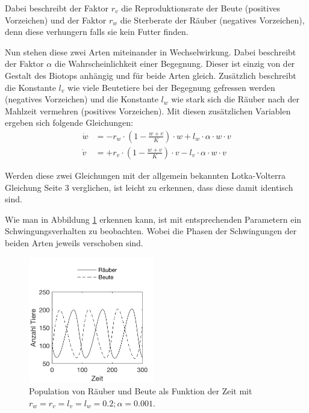 \documentclass[a4paper,twoside]{article}
\begin{document}
	Dabei beschreibt der Faktor \(r_v\) die Reproduktionsrate der Beute (positives Vorzeichen) und der Faktor \(r_w\) die Sterberate der Räuber (negatives Vorzeichen), denn diese verhungern falls sie kein Futter finden.

	Nun stehen diese zwei Arten miteinander in Wechselwirkung. Dabei beschreibt der Faktor \(\alpha\) die Wahrscheinlichkeit einer Begegnung. Dieser ist einzig von der Gestalt des Biotops anhängig und für beide Arten gleich. Zusätzlich beschreibt die Konstante \(l_{v}\) wie viele Beutetiere bei der Begegnung gefressen werden (negatives Vorzeichen) und die Konstante \(l_{w}\) wie stark sich die Räuber nach der Mahlzeit vermehren (positives Vorzeichen). Mit diesen zusätzlichen Variablen ergeben sich folgende Gleichungen:
	 \begin{align*}
		\dot{w} &= -r_w \cdot \left(1 - \frac{w+v}{K} \right) \cdot w + l_w \cdot \alpha \cdot w \cdot v \\
		\dot{v} &= +r_v \cdot \left(1 - \frac{w+v}{K} \right) \cdot v - l_v \cdot \alpha \cdot w \cdot v
	\end{align*}

	Werden diese zwei Gleichungen mit der allgemein bekannten Lotka-Volterra Gleichung \cite{PredatorPrey} Seite 3 verglichen, ist leicht zu erkennen, dass diese damit identisch sind.
	
	\newpage

	Wie man in Abbildung \ref{fig:beute_raeuber_oszillation} erkennen kann, ist mit entsprechenden Parametern ein Schwingungsverhalten zu beobachten. Wobei die Phasen der Schwingungen der beiden Arten jeweils verschoben sind.
	
	\begin{figure}[!h]
  		\centering
 		\includegraphics[width=5.5cm]{Diagramme/beute_raeuber_oszillation.png}
  		\caption{Population von Räuber und Beute als Funktion der Zeit mit \(r_w = r_v = l_v = l_w = 0.2; \alpha = 0.001\).}
  		\label{fig:beute_raeuber_oszillation}
	\end{figure}
	
\end{document}
